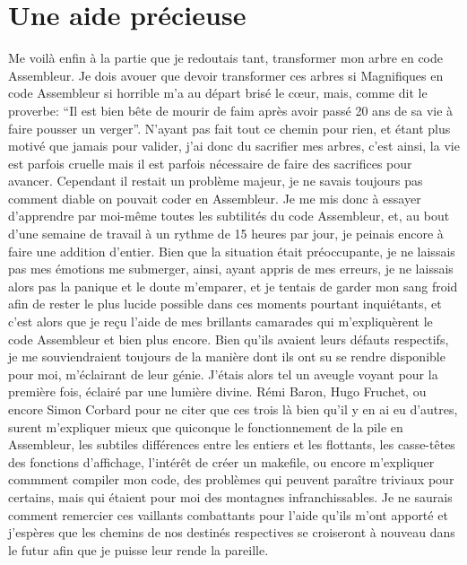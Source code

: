 \documentclass{report}
\begin{document}
\section{Une aide précieuse}
Me voilà enfin à la partie que je redoutais tant, transformer mon arbre en code Assembleur. Je dois avouer que devoir transformer ces arbres si Magnifiques en code Assembleur si horrible m'a au départ brisé le cœur, mais, comme dit le proverbe: ``Il est bien bête de mourir de faim après avoir passé 20 ans de sa vie à faire pousser un verger''. N'ayant pas fait tout ce chemin pour rien, et étant plus motivé que jamais pour valider, j'ai donc du sacrifier mes arbres, c'est ainsi, la vie est parfois cruelle mais il est parfois nécessaire de faire des sacrifices pour avancer. Cependant il restait un problème majeur, je ne savais toujours pas comment diable on pouvait coder en Assembleur. Je me mis donc à essayer d'apprendre par moi-même toutes les subtilités du code Assembleur, et, au bout d'une semaine de travail à un rythme de 15 heures par jour, je peinais encore à faire une addition d'entier. Bien que la situation était préoccupante, je ne laissais pas mes émotions me submerger, ainsi, ayant appris de mes erreurs, je ne laissais alors pas la panique et le doute m'emparer, et je tentais de garder mon sang froid afin de rester le plus lucide possible dans ces moments pourtant inquiétants, et c'est alors que je reçu l'aide de mes brillants camarades qui m'expliquèrent le code Assembleur et bien plus encore. Bien qu'ils avaient leurs défauts respectifs, je me souviendraient toujours de la manière dont ils ont su se rendre disponible pour moi, m'éclairant de leur génie. J'étais alors tel un aveugle voyant pour la première fois, éclairé par une lumière divine. Rémi Baron, Hugo Fruchet, ou encore Simon Corbard pour ne citer que ces trois là bien qu'il y en ai eu d'autres, surent m'expliquer mieux que quiconque le fonctionnement de la pile en Assembleur, les subtiles différences entre les entiers et les flottants, les casse-têtes des fonctions d'affichage, l'intérêt de créer un makefile, ou encore m'expliquer commment compiler mon code, des problèmes qui peuvent paraître triviaux pour certains, mais qui étaient pour moi des montagnes infranchissables. Je ne saurais comment remercier ces vaillants combattants pour l'aide qu'ils m'ont apporté et j'espères que les chemins de nos destinés respectives se croiseront à nouveau dans le futur afin que je puisse leur rende la pareille.
\end{document}
